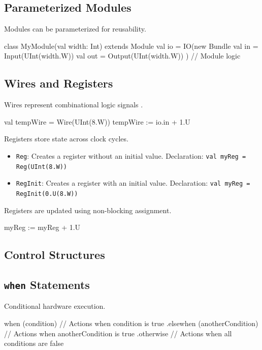 \subsection{Parameterized Modules}
Modules can be parameterized for reusability.
\begin{chiselcode}
class MyModule(val width: Int) extends Module {
  val io = IO(new Bundle {
    val in  = Input(UInt(width.W))
    val out = Output(UInt(width.W))
  })
  // Module logic
}    
\end{chiselcode}

\subsection{Wires and Registers}
Wires represent combinational logic signals \cite{chisel-doc}.
\begin{chiselcode}
val tempWire = Wire(UInt(8.W))
tempWire := io.in + 1.U    
\end{chiselcode}

Registers store state across clock cycles.
\begin{itemize}
    \item \texttt{Reg}: Creates a register without an initial value.
        \newline Declaration: \texttt{val myReg = Reg(UInt(8.W))}
    \item \texttt{RegInit}: Creates a register with an initial value.
        \newline Declaration: \texttt{val myReg = RegInit(0.U(8.W))}
\end{itemize}

Registers are updated using non-blocking assignment.
\begin{chiselcode}
myReg := myReg + 1.U    
\end{chiselcode}

\subsection{Control Structures}

\subsection{\texttt{when} Statements}
Conditional hardware execution.
\begin{chiselcode}
when (condition) {
  // Actions when condition is true
} .elsewhen (anotherCondition) {
  // Actions when anotherCondition is true
} .otherwise {
  // Actions when all conditions are false
}
\end{chiselcode}

